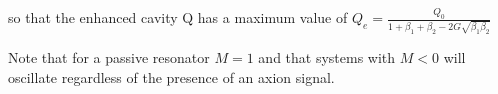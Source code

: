 \documentclass[aps,prl,twocolumn,groupedaddress]{revtex4-1}
\begin{document}

so that the enhanced cavity Q has a maximum value of 
$Q_e = \frac{Q_0}{1 + \beta_1 + \beta_2 - 2G\sqrt{\beta_1 \beta_2}}$

Note that for a passive resonator $M=1$ and that systems with $M<0$ will oscillate regardless of the presence of an axion signal. 
\end{document}
